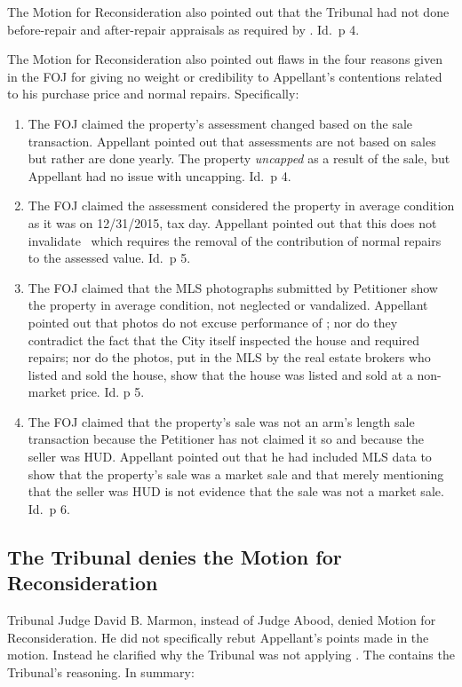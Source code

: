 \documentclass[12pt,\documentclassflag]{michiganCourtOfAppealsBrief}
\begin{document}
The Motion for Reconsideration also pointed out that the Tribunal had not done before-repair and after-repair appraisals as required by \mathieuGast. Id.\ p 4.

The Motion for Reconsideration also pointed out flaws in the four reasons given in the FOJ for giving no weight or credibility to Appellant's contentions related to his purchase price and normal repairs. Specifically:

\begin{enumerate}
\item The FOJ claimed the property's assessment changed based on the sale transaction. Appellant pointed out that assessments are not based on sales but rather are done yearly. The property \emph{uncapped} as a result of the sale, but Appellant had no issue with uncapping. Id.\ p 4.

\item The FOJ claimed the assessment considered the property in average condition as it was on 12/31/2015, tax day. Appellant pointed out that this does not invalidate \mathieuGast\ which requires the removal of the contribution of normal repairs to the assessed value. Id.\ p 5. 

\item The FOJ claimed that the MLS photographs submitted by Petitioner show the property in average condition, not neglected or vandalized. Appellant pointed out that photos do not excuse performance of \mathieuGast; nor do they contradict the fact that the City itself inspected the house and required repairs; nor do the photos, put in the MLS by the real estate brokers who listed and sold the house, show that the house was listed and sold at a non-market price. Id. p 5.
  
\item The FOJ claimed that the property's sale was not an arm's length sale transaction because the Petitioner has not claimed it so and because the seller was HUD. Appellant pointed out that he had included MLS data to show that the property's sale was a market sale and that merely mentioning that the seller was HUD is not evidence that the sale was not a market sale. Id.\ p 6.
\end{enumerate}

\subsection{The Tribunal denies the Motion for Reconsideration}

Tribunal Judge David B. Marmon, instead of Judge Abood, denied Motion for Reconsideration. He did not specifically rebut Appellant's points made in the motion. Instead he clarified why the Tribunal was not applying \mathieuGast. The \reconsiderationDenied[2] contains the Tribunal's reasoning. In summary:
\end{document}

